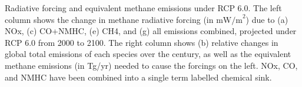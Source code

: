 Radiative forcing and equivalent methane emissions under RCP 6.0. The left column shows the change in methane radiative forcing (in $\mathrm{mW/m}^2$) due to (a) NOx, (c) CO+NMHC, (e) CH4, and (g) all emissions combined, projected under RCP 6.0 from 2000 to 2100. The right column shows (b) relative changes in global total emissions of each species over the century, as well as the equivalent methane emissions (in Tg/yr) needed to cause the forcings on the left. NOx, CO, and NMHC have been combined into a single term labelled chemical sink.\label{fig:eqems}